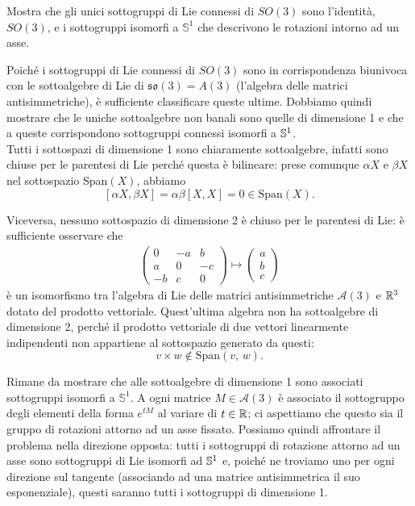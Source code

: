 \documentclass[a4paper]{article}
\begin{document}
\begin{ex}[4.6]{Mostra che gli unici sottogruppi di Lie connessi di $ SO(3) $ sono l’identità, $ SO(3) $, e i sottogruppi isomorfi a $ \mathbb{S}^1 $ che descrivono le rotazioni intorno ad un asse.}
	
	Poiché i sottogruppi di Lie connessi di $ SO(3) $ sono in corrispondenza biunivoca con le sottoalgebre di Lie di $ \mathfrak{so}(3) = A(3) $ (l'algebra delle matrici antisimmetriche), è sufficiente classificare queste ultime. Dobbiamo quindi mostrare che le uniche sottoalgebre non banali sono quelle di dimensione 1 e che a queste corrispondono sottogruppi connessi isomorfi a $ \S^1 $.\\
	
	Tutti i sottospazi di dimensione 1 sono chiaramente sottoalgebre, infatti sono chiuse per le parentesi di Lie perché questa è bilineare: prese comunque $ \alpha X $ e $ \beta X $ nel sottospazio Span$ (X) $, abbiamo $$  [\alpha X, \beta X] = \alpha\beta[X, X] = 0 \in \text{Span}(X).  $$
	
	Viceversa, nessuno sottospazio di dimensione 2 è chiuso per le parentesi di Lie: è sufficiente osservare che 
	\begin{align*}
		\left(\begin{matrix}
		0 & -a & b \\
		a & 0 & -c \\
		-b & c & 0 
		\end{matrix}\right) \mapsto \left(\begin{matrix}
		a \\ b \\ c
		\end{matrix}\right)
	\end{align*}
	è un isomorfismo tra l'algebra di Lie delle matrici antisimmetriche $ \mathcal{A}(3) $ e $ \R^3 $ dotato del prodotto vettoriale. Quest'ultima algebra non ha sottoalgebre di dimensione 2, perché il prodotto vettoriale di due vettori linearmente indipendenti non appartiene al sottospazio generato da questi: $$  v \times w \notin \text{Span}(v, \, w).  $$
	
	Rimane da mostrare che alle sottoalgebre di dimensione 1 sono associati sottogruppi isomorfi a $ \mathbb{S}^1 $. A ogni matrice $ M \in \mathcal{A}(3) $ è associato il sottogruppo degli elementi della forma $ e^{tM} $ al variare di $ t \in \R $; ci aspettiamo che questo sia il gruppo di rotazioni attorno ad un asse fissato. Possiamo quindi affrontare il problema nella direzione opposta: tutti i sottogruppi di rotazione attorno ad un asse sono sottogruppi di Lie isomorfi ad $ \S^1 $ e, poiché ne troviamo uno per ogni direzione sul tangente (associando ad una matrice antisimmetrica il suo esponenziale), questi saranno tutti i sottogruppi di dimensione 1.
\end{ex}
\end{document}
